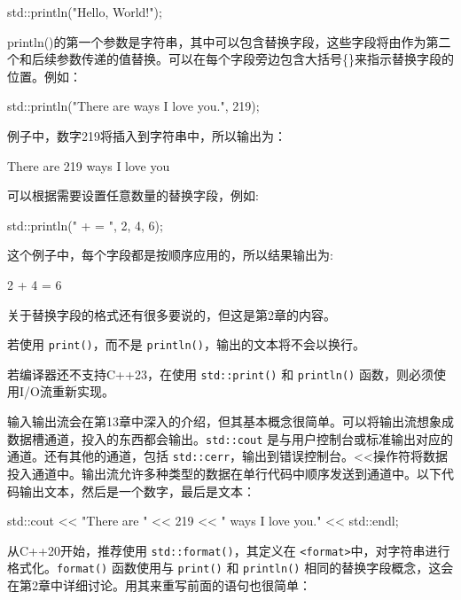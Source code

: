 \begin{cpp}
std::println("Hello, World!");
\end{cpp}

println()的第一个参数是字符串，其中可以包含替换字段，这些字段将由作为第二个和后续参数传递的值替换。可以在每个字段旁边包含大括号\{\}来指示替换字段的位置。例如：

\begin{cpp}
std::println("There are {} ways I love you.", 219);
\end{cpp}

例子中，数字219将插入到字符串中，所以输出为：

\begin{shell}
There are 219 ways I love you
\end{shell}

可以根据需要设置任意数量的替换字段，例如:

\begin{cpp}
std::println("{} + {} = {}", 2, 4, 6);
\end{cpp}

这个例子中，每个字段都是按顺序应用的，所以结果输出为:

\begin{shell}
2 + 4 = 6
\end{shell}

关于替换字段的格式还有很多要说的，但这是第2章的内容。

若使用 \verb|print()|，而不是 \verb|println()|，输出的文本将不会以换行。


若编译器还不支持C++23，在使用 \verb|std::print()| 和 \verb|println()| 函数，则必须使用I/O流重新实现。

输入输出流会在第13章中深入的介绍，但其基本概念很简单。可以将输出流想象成数据槽通道，投入的东西都会输出。\verb|std::cout| 是与用户控制台或标准输出对应的通道。还有其他的通道，包括 \verb|std::cerr|，输出到错误控制台。<{}<操作符将数据投入通道中。输出流允许多种类型的数据在单行代码中顺序发送到通道中。以下代码输出文本，然后是一个数字，最后是文本：

\begin{cpp}
std::cout << "There are " << 219 << " ways I love you." << std::endl;
\end{cpp}

从C++20开始，推荐使用 \verb|std::format()|，其定义在 \verb|<format>|中，对字符串进行格式化。\verb|format()| 函数使用与 \verb|print()| 和 \verb|println()| 相同的替换字段概念，这会在第2章中详细讨论。用其来重写前面的语句也很简单：

